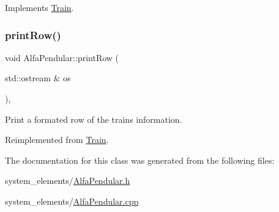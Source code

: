 Implements \mbox{\hyperlink{classTrain_ad2bd424547b5be4e3fa8e491f1ce790d}{Train}}.

\mbox{\label{classAlfaPendular_aceb64b85c475612b8045d0108b448669}} 
\subsubsection{\texorpdfstring{print\+Row()}{printRow()}}
{\footnotesize\ttfamily void Alfa\+Pendular\+::print\+Row (\begin{DoxyParamCaption}\item[{std\+::ostream \&}]{os }\end{DoxyParamCaption})\hspace{0.3cm}{\ttfamily [override]}, {\ttfamily [virtual]}}

Print a formated row of the trains information. 

Reimplemented from \mbox{\hyperlink{classTrain_a3fd1c87c2152aa96cc6928f0aea37e21}{Train}}.



The documentation for this class was generated from the following files\+:\begin{DoxyCompactItemize}
\item 
system\+\_\+elements/\mbox{\hyperlink{AlfaPendular_8h}{Alfa\+Pendular.\+h}}\item 
system\+\_\+elements/\mbox{\hyperlink{AlfaPendular_8cpp}{Alfa\+Pendular.\+cpp}}\end{DoxyCompactItemize}

